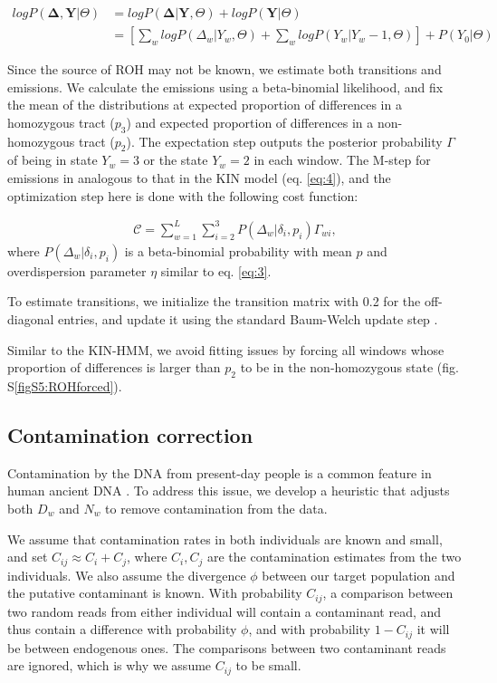 \documentclass[12pt, letterpaper]{article}
\begin{document}
\begin{align}\label{eq:10}
    log P(\mathbf{\Delta},\mathbf{Y}|\Theta) &= log P(\mathbf{\Delta}|\mathbf{Y},\Theta) + log P(\mathbf{Y}|\Theta)\nonumber\\
 &= [\sum_{w} log P(\Delta_w|Y_w, \Theta) + \sum_{w} log P(Y_w|Y_w-1, \Theta)] + P(Y_0| \Theta)
\end{align}

Since the source of ROH may not be known,  we estimate both transitions and emissions. We calculate the emissions using a beta-binomial likelihood, and fix the mean of the distributions at expected proportion of differences in a homozygous tract ($p_3$) and expected proportion of differences in a non-homozygous tract ($p_2$). The expectation step outputs the posterior probability $\Gamma$ of being in state $Y_w=3$ or the state $Y_w=2$ in each window. The M-step for emissions in analogous to that in the KIN model (eq. \ref{eq:4}), and the optimization step here is done with the following cost function:

\begin{align}\label{eq:11}
\mathcal{C} = \sum_{w=1}^L \sum_{i=2}^3 P(\Delta_w|\delta_{i},p_{i}) \Gamma_{wi} ,
\end{align}
where $P(\Delta_w|\delta_{i},p_{i})$ is a beta-binomial probability with mean $p$ and overdispersion parameter $\eta$ similar to eq. \ref{eq:3}.

To estimate transitions, we initialize the transition matrix with 0.2 for the off-diagonal entries, and update it using the standard Baum-Welch update step \cite{baum_maximization_1970}.

Similar to the KIN-HMM, we avoid fitting issues by forcing all windows whose proportion of differences is larger than $p_2$ to be in the non-homozygous state (fig. S\ref{figS5:ROHforced}).

\subsection{Contamination correction}\label{contam}
Contamination by the DNA from present-day people is a common feature in human ancient DNA \cite{peyregne_present-day_2020}. To address this issue, we develop a heuristic that adjusts both $D_w$ and $N_w$ to remove contamination from the data.

We assume that contamination rates in both individuals are known and small, and set $C_{ij} \approx C_i + C_j$, where $C_i, C_j$ are the contamination estimates from the two individuals. We also assume the divergence $\phi$ between our target population and the putative contaminant is known. With probability $C_{ij}$, a comparison between two random reads from either individual will contain a contaminant read, and thus contain a difference with probability $\phi$, and with probability $1 - C_{ij}$ it will be between endogenous ones. The comparisons between two contaminant reads are ignored, which is why we assume $C_{ij}$ to be small.
\end{document}

